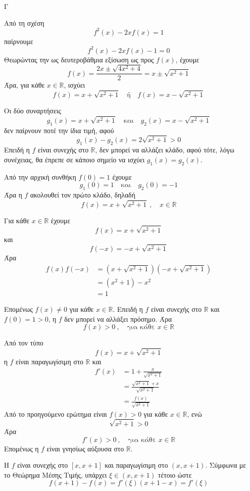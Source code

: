 
\begin{thema}{Γ}
\begin{erwthma}
\item Από τη σχέση
\[
f^2(x)-2xf(x)=1
\]
παίρνουμε
\[
f^2(x)-2xf(x)-1=0
\]
Θεωρώντας την ως δευτεροβάθμια εξίσωση ως προς $f(x)$, έχουμε
\[
f(x)=\frac{2x\pm\sqrt{4x^2+4}}{2}=x\pm\sqrt{x^2+1}
\]
Άρα, για κάθε $x\in\mathbb{R}$, ισχύει
\[
f(x)=x+\sqrt{x^2+1}
\quad \text{ή}\quad
f(x)=x-\sqrt{x^2+1}
\]

Οι δύο συναρτήσεις
\[
g_1(x)=x+\sqrt{x^2+1}
\quad \text{και}\quad
g_2(x)=x-\sqrt{x^2+1}
\]
δεν παίρνουν ποτέ την ίδια τιμή, αφού
\[
g_1(x)-g_2(x)=2\sqrt{x^2+1}>0
\]
Επειδή η $f$ είναι συνεχής στο $\mathbb{R}$, δεν μπορεί να αλλάζει κλάδο, αφού τότε, λόγω συνέχειας, θα έπρεπε σε κάποιο σημείο να ισχύει $g_1(x)=g_2(x)$.

Από την αρχική συνθήκη $f(0)=1$ έχουμε
\[
g_1(0)=1\quad \text{και}\quad g_2(0)=-1
\]
Άρα η $f$ ακολουθεί τον πρώτο κλάδο, δηλαδή
\[
f(x)=x+\sqrt{x^2+1}\ ,\quad x\in\mathbb{R}
\]

\item Για κάθε $x\in\mathbb{R}$ έχουμε
\[
f(x)=x+\sqrt{x^2+1}
\]
και
\[
f(-x)=-x+\sqrt{x^2+1}
\]
Άρα
\begin{align*}
f(x)f(-x)
&=\left(x+\sqrt{x^2+1}\right)\left(-x+\sqrt{x^2+1}\right)\\
&=(x^2+1)-x^2\\
&=1
\end{align*}

Επομένως $f(x)\neq 0$ για κάθε $x\in\mathbb{R}$.
Επειδή η $f$ είναι συνεχής στο $\mathbb{R}$ και $f(0)=1>0$, η $f$ δεν μπορεί να αλλάξει πρόσημο.
Άρα
\[
f(x)>0\ ,\quad \text{για κάθε }x\in\mathbb{R}
\]

\item Από τον τύπο
\[
f(x)=x+\sqrt{x^2+1}
\]
η $f$ είναι παραγωγίσιμη στο $\mathbb{R}$ και
\begin{align*}
f'(x)
&=1+\frac{x}{\sqrt{x^2+1}}\\
&=\frac{\sqrt{x^2+1}+x}{\sqrt{x^2+1}}\\
&=\frac{f(x)}{\sqrt{x^2+1}}
\end{align*}
Από το προηγούμενο ερώτημα είναι $f(x)>0$ για κάθε $x\in\mathbb{R}$, ενώ
\[
\sqrt{x^2+1}>0
\]
Άρα
\[
f'(x)>0\ ,\quad \text{για κάθε }x\in\mathbb{R}
\]
Επομένως η $f$ είναι γνησίως αύξουσα στο $\mathbb{R}$.

\item Η $f$ είναι συνεχής στο $[x,x+1]$ και παραγωγίσιμη στο $(x,x+1)$.
Σύμφωνα με το Θεώρημα Μέσης Τιμής, υπάρχει $\xi\in(x,x+1)$ τέτοιο ώστε
\[
f(x+1)-f(x)=f'(\xi)(x+1-x)=f'(\xi)
\]


\end{erwthma}
\end{thema}
